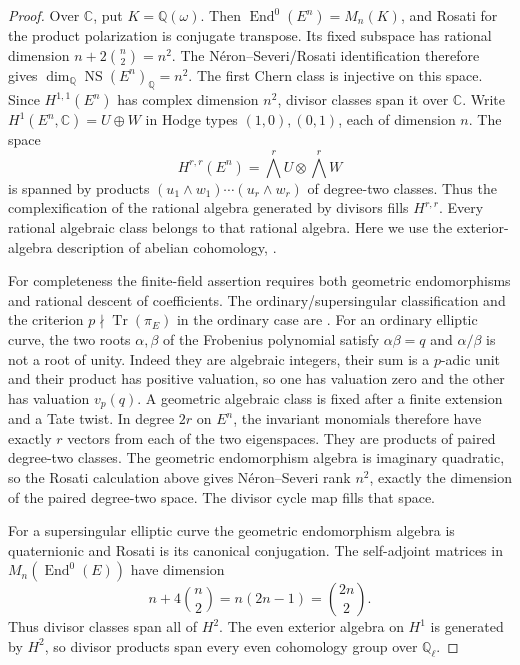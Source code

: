 \documentclass[11pt,a4paper]{article}
\theoremstyle{remark}
\begin{document}
\begin{proof}
Over $\mathbb C$, put $K=\mathbb Q(\omega)$. Then
$\operatorname{End}^0(E^n)=M_n(K)$, and Rosati for the product polarization is conjugate transpose. Its fixed subspace has rational dimension
$n+2\binom n2=n^2$. The N\'eron--Severi/Rosati identification
\cite[Prop.~13.1]{MilneAV} therefore gives $\dim_{\mathbb Q}\operatorname{NS}(E^n)_{\mathbb Q}=n^2$. The first Chern class is injective on this space. Since $H^{1,1}(E^n)$ has complex dimension $n^2$, divisor classes span it over $\mathbb C$.
Write $H^1(E^n,\mathbb C)=U\oplus W$ in Hodge types $(1,0),(0,1)$, each of dimension $n$. The space
\[
 H^{r,r}(E^n)=\bigwedge^rU\otimes\bigwedge^rW
\]
is spanned by products $(u_1\wedge w_1)\cdots(u_r\wedge w_r)$ of degree-two classes. Thus the complexification of the rational algebra generated by divisors fills $H^{r,r}$. Every rational algebraic class belongs to that rational algebra. Here we use the exterior-algebra description of abelian cohomology, \cite[Th.~11.1(b), and Th.~2.3 for Betti cohomology]{MilneAV}.

For completeness the finite-field assertion requires both geometric endomorphisms and rational descent of coefficients. The ordinary/supersingular classification and the criterion $p\nmid\operatorname{Tr}(\pi_E)$ in the ordinary case are \cite[Th.~13.3, Th.~13.18, Cor.~13.20]{SutherlandEC}. For an ordinary elliptic curve, the two roots $\alpha,\beta$ of the Frobenius polynomial satisfy $\alpha\beta=q$ and $\alpha/\beta$ is not a root of unity. Indeed they are algebraic integers, their sum is a $p$-adic unit and their product has positive valuation, so one has valuation zero and the other has valuation $v_p(q)$. A geometric algebraic class is fixed after a finite extension and a Tate twist. In degree $2r$ on $E^n$, the invariant monomials therefore have exactly $r$ vectors from each of the two eigenspaces. They are products of paired degree-two classes. The geometric endomorphism algebra is imaginary quadratic, so the Rosati calculation above gives N\'eron--Severi rank $n^2$, exactly the dimension of the paired degree-two space. The divisor cycle map fills that space.

For a supersingular elliptic curve the geometric endomorphism algebra is quaternionic and Rosati is its canonical conjugation. The self-adjoint matrices in $M_n(\operatorname{End}^0(E))$ have dimension
\[
 n+4\binom n2=n(2n-1)=\binom{2n}{2}.
\]
Thus divisor classes span all of $H^2$. The even exterior algebra on $H^1$ is generated by $H^2$, so divisor products span every even cohomology group over $\mathbb Q_\ell$.


\end{proof}
\end{document}
